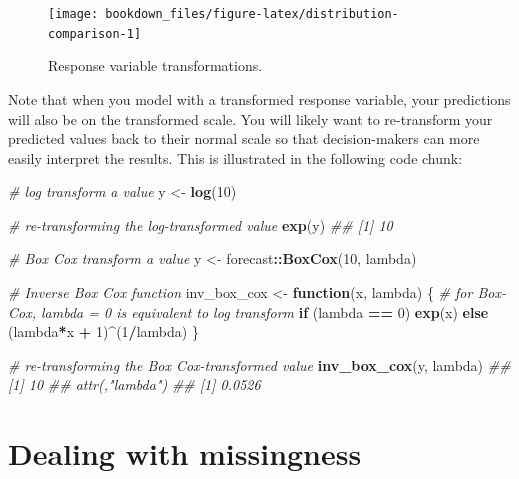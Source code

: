 \documentclass[]{krantz}
\makeatletter
\newenvironment{Shaded}{\begin{snugshade}}{\end{snugshade}}
\newcommand{\CommentTok}[1]{\textcolor[rgb]{0.37,0.37,0.37}{\textit{#1}}}
\newcommand{\ControlFlowTok}[1]{\textcolor[rgb]{0.27,0.27,0.27}{\textbf{#1}}}
\newcommand{\DecValTok}[1]{\textcolor[rgb]{0.06,0.06,0.06}{#1}}
\newcommand{\KeywordTok}[1]{\textcolor[rgb]{0.27,0.27,0.27}{\textbf{#1}}}
\newcommand{\NormalTok}[1]{#1}
\newcommand{\OperatorTok}[1]{\textcolor[rgb]{0.43,0.43,0.43}{\textbf{#1}}}
\newcommand{\StringTok}[1]{\textcolor[rgb]{0.5,0.5,0.5}{#1}}
\newenvironment{kframe}{%
\medskip{}
\setlength{\fboxsep}{.8em}
 \def\at@end@of@kframe{}%
 \ifinner\ifhmode%
  \def\at@end@of@kframe{\end{minipage}}%
  \begin{minipage}{\columnwidth}%
 \fi\fi%
 \def\FrameCommand##1{\hskip\@totalleftmargin \hskip-\fboxsep
 \colorbox{shadecolor}{##1}\hskip-\fboxsep
     \hskip-\linewidth \hskip-\@totalleftmargin \hskip\columnwidth}%
 \MakeFramed {\advance\hsize-\width
   \@totalleftmargin\z@ \linewidth\hsize
   \@setminipage}}%
 {\par\unskip\endMakeFramed%
 \at@end@of@kframe}
\renewenvironment{Shaded}{\begin{kframe}}{\end{kframe}}
\makeatother
\begin{document}
\begin{figure}

{\centering \texttt{[image: bookdown\_files/figure-latex/distribution-comparison-1]} 

}

\caption{Response variable transformations.}\label{fig:distribution-comparison}
\end{figure}

Note that when you model with a transformed response variable, your predictions will also be on the transformed scale. You will likely want to re-transform your predicted values back to their normal scale so that decision-makers can more easily interpret the results. This is illustrated in the following code chunk:

\begin{Shaded}
\begin{Highlighting}[]
\CommentTok{# log transform a value}
\NormalTok{y <-}\StringTok{ }\KeywordTok{log}\NormalTok{(}\DecValTok{10}\NormalTok{)}

\CommentTok{# re-transforming the log-transformed value}
\KeywordTok{exp}\NormalTok{(y)}
\CommentTok{## [1] 10}

\CommentTok{# Box Cox transform a value}
\NormalTok{y <-}\StringTok{ }\NormalTok{forecast}\OperatorTok{::}\KeywordTok{BoxCox}\NormalTok{(}\DecValTok{10}\NormalTok{, lambda)}

\CommentTok{# Inverse Box Cox function}
\NormalTok{inv_box_cox <-}\StringTok{ }\ControlFlowTok{function}\NormalTok{(x, lambda) \{}
  \CommentTok{# for Box-Cox, lambda = 0 is equivalent to log transform}
  \ControlFlowTok{if}\NormalTok{ (lambda }\OperatorTok{==}\StringTok{ }\DecValTok{0}\NormalTok{) }\KeywordTok{exp}\NormalTok{(x) }\ControlFlowTok{else}\NormalTok{ (lambda}\OperatorTok{*}\NormalTok{x }\OperatorTok{+}\StringTok{ }\DecValTok{1}\NormalTok{)}\OperatorTok{^}\NormalTok{(}\DecValTok{1}\OperatorTok{/}\NormalTok{lambda) }
\NormalTok{\}}

\CommentTok{# re-transforming the Box Cox-transformed value}
\KeywordTok{inv_box_cox}\NormalTok{(y, lambda)}
\CommentTok{## [1] 10}
\CommentTok{## attr(,"lambda")}
\CommentTok{## [1] 0.0526}
\end{Highlighting}
\end{Shaded}

\hypertarget{dealing-with-missingness}{%
\section{Dealing with missingness}\label{dealing-with-missingness}}
\end{document}
